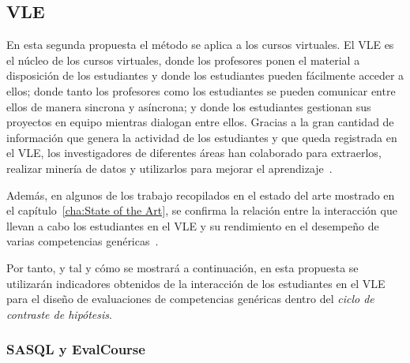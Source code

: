 


\subsection{VLE}

En esta segunda propuesta el método se aplica a los cursos virtuales. El VLE es el núcleo de los cursos virtuales, donde los profesores ponen el material a disposición de los estudiantes y donde los estudiantes pueden fácilmente acceder a ellos; donde tanto los profesores como los estudiantes se pueden comunicar entre ellos de manera sincrona y asíncrona; y donde los estudiantes gestionan sus proyectos en equipo mientras dialogan entre ellos. Gracias a la gran cantidad de información que genera la actividad de los estudiantes y que queda registrada en el VLE, los investigadores de diferentes áreas han colaborado para extraerlos, realizar minería de datos y utilizarlos para mejorar el aprendizaje~\cite{park2015development}.

Además, en algunos de los trabajo recopilados en el estado del arte mostrado en el capítulo~\ref{cha:State of the Art}, se confirma la relación entre la interacción que llevan a cabo los estudiantes en el VLE y su rendimiento en el desempeño de varias competencias genéricas~\cite{fidalgo:2015,rayon2014web}. 

Por tanto, y tal y cómo se mostrará a continuación, en esta propuesta se utilizarán indicadores obtenidos de la interacción de los estudiantes en el VLE para el diseño de evaluaciones de competencias genéricas dentro del  \emph{ciclo de contraste de hipótesis}.


\subsubsection{SASQL y EvalCourse}

